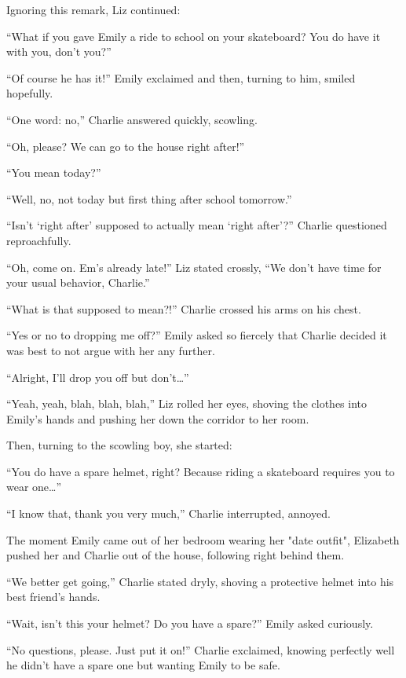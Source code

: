 Ignoring this remark, Liz continued:

“What if you gave Emily a ride to school on your skateboard? You do have it with you, don’t you?”

“Of course he has it!” Emily exclaimed and then, turning to him, smiled hopefully.

“One word: no,” Charlie answered quickly, scowling.

“Oh, please? We can go to the house right after!”

“You mean today?”

“Well, no, not today but first thing after school tomorrow.”

“Isn’t ‘right after’ supposed to actually mean ‘right after’?” Charlie questioned reproachfully.

“Oh, come on. Em’s already late!” Liz stated crossly, “We don’t have time for your usual behavior, Charlie.”

“What is that supposed to mean?!” Charlie crossed his arms on his chest.

“Yes or no to dropping me off?” Emily asked so fiercely that Charlie decided it was best to not argue with her any further.

“Alright, I’ll drop you off but don’t…”

“Yeah, yeah, blah, blah, blah,” Liz rolled her eyes, shoving the clothes into Emily’s hands and pushing her down the corridor to her room.

Then, turning to the scowling boy, she started:

“You do have a spare helmet, right? Because riding a skateboard requires you to wear one…”

“I know that, thank you very much,” Charlie interrupted, annoyed.

The moment Emily came out of her bedroom wearing her "date outfit", Elizabeth pushed her and Charlie out of the house, following right behind them.

“We better get going,” Charlie stated dryly, shoving a protective helmet into his best friend’s hands.

“Wait, isn’t this your helmet? Do you have a spare?” Emily asked curiously.

“No questions, please. Just put it on!” Charlie exclaimed, knowing perfectly well he didn’t have a spare one but wanting Emily to be safe.